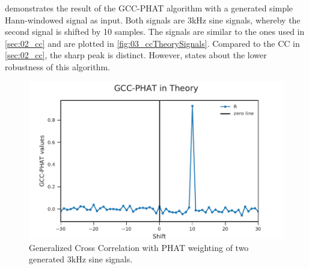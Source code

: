  demonstrates the result of the \ac{GCC-PHAT} algorithm with a generated
simple Hann-windowed signal as input. Both signals are 3\si{\kilo\hertz} sine signals, whereby
the second signal is shifted by 10 samples.
The signals are similar to the ones used in \cref{sec:02_cc}
and are plotted in \cref{fig:03_ccTheorySignals}.
Compared to the \ac{CC} in \cref{sec:02_cc}, the sharp peak is distinct.
However, \cite{K_C_GCC} states about the lower robustness of this algorithm.
\begin{figure}[ht]
	\centering
		\includegraphics[width=0.9\columnwidth]{figures/GCC_theory}
	\caption{Generalized Cross Correlation with PHAT weighting of two generated 3\si{\kilo\hertz} sine signals.}
    \label{fig:03_gccTheory}
\end{figure}

